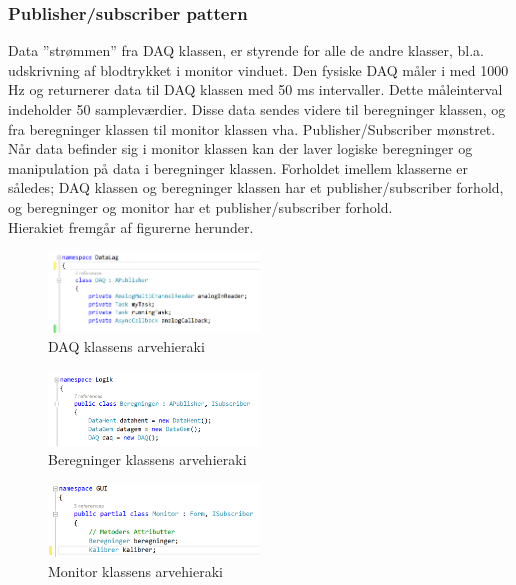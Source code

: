 \subsubsection{Publisher/subscriber pattern}
Data ”strømmen” fra DAQ klassen, er styrende for alle de andre klasser, bl.a. udskrivning af blodtrykket i monitor vinduet. Den fysiske DAQ måler i med 1000 Hz og returnerer data til DAQ klassen med 50 ms intervaller. Dette måleinterval indeholder 50 sampleværdier. Disse data sendes videre til beregninger klassen, og fra beregninger klassen til monitor klassen vha. Publisher/Subscriber mønstret. Når data befinder sig i monitor klassen kan der laver logiske beregninger og manipulation på data i beregninger klassen.
Forholdet imellem klasserne er således; DAQ klassen og beregninger klassen har et publisher/subscriber forhold, og  beregninger og monitor har et publisher/subscriber forhold. \\
Hierakiet fremgår af figurerne herunder.
\begin{figure}[H]
	\centering
	\includegraphics[width=0.5\textwidth]{Figurer/DAQ_pub}
	\caption{DAQ klassens arvehieraki}
\end{figure}

\begin{figure}[H]
	\centering
	\includegraphics[width=0.5\textwidth]{Figurer/Beregninger_subpub}
	\caption{Beregninger klassens arvehieraki}
\end{figure}

\begin{figure}[H]
	\centering
	\includegraphics[width=0.5\textwidth]{Figurer/Monitor_sub}
	\caption{Monitor klassens arvehieraki}
\end{figure}


